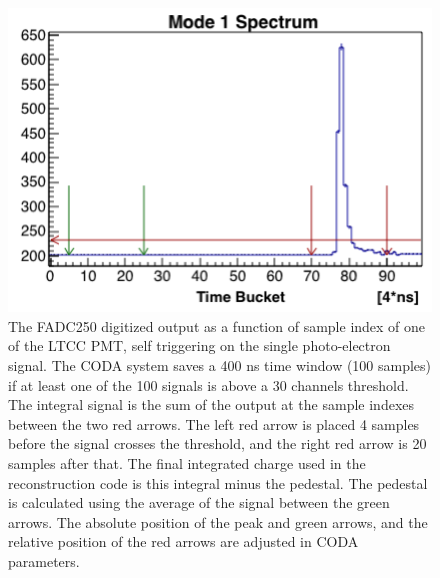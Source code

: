 \begin{figure}
	\centering
	\includegraphics[width=0.95\columnwidth,keepaspectratio]{img/fadc.png}
	\caption{The FADC250 digitized output as a function of sample index of one of the LTCC PMT, self triggering on the single photo-electron signal.
            The CODA system saves a 400 ns time window (100 samples) if at least one of the 100 signals is above a 30 channels threshold.
            The integral signal is the sum of the output at the sample indexes between the two red arrows.
            The left red arrow is placed 4 samples before the signal crosses the threshold,
            and the right red arrow is 20 samples after that. The final integrated charge used in the reconstruction code is this integral minus the pedestal.
            The pedestal is calculated using the average of the signal between the green arrows.
				The absolute position of the peak and green arrows, and the relative position of the red arrows are adjusted in CODA parameters.}
	\label{fig:fadc}
\end{figure}




